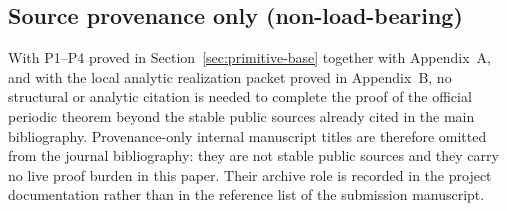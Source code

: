 \subsection*{Source provenance only (non-load-bearing)}
With P1--P4 proved in Section~\ref{sec:primitive-base} together with Appendix~A, and with the local analytic realization packet proved in Appendix~B, no structural or analytic citation is needed to complete the proof of the official periodic theorem beyond the stable public sources already cited in the main bibliography. Provenance-only internal manuscript titles are therefore omitted from the journal bibliography: they are not stable public sources and they carry no live proof burden in this paper. Their archive role is recorded in the project documentation rather than in the reference list of the submission manuscript.